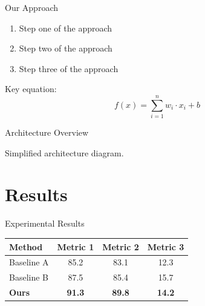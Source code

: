 \documentclass[aspectratio=169]{beamer}
\begin{document}
\begin{frame}{Our Approach}
    \begin{enumerate}
        \item Step one of the approach
        \item Step two of the approach
        \item Step three of the approach
    \end{enumerate}

    \vspace{1em}
    Key equation:
    \[
        f(x) = \sum_{i=1}^{n} w_i \cdot x_i + b
    \]
\end{frame}

\begin{frame}{Architecture Overview}
    \centering

    \vspace{1em}
    {\small Simplified architecture diagram.}
\end{frame}

\section{Results}

\begin{frame}{Experimental Results}
    \centering
    \begin{tabular}{lccc}
        \toprule
        \textbf{Method} & \textbf{Metric 1} & \textbf{Metric 2} & \textbf{Metric 3} \\
        \midrule
        Baseline A & 85.2 & 83.1 & 12.3 \\
        Baseline B & 87.5 & 85.4 & 15.7 \\
        \rowcolor{primary!10}
        \textbf{Ours} & \textbf{91.3} & \textbf{89.8} & \textbf{14.2} \\
        \bottomrule
    \end{tabular}
\end{frame}
\end{document}
